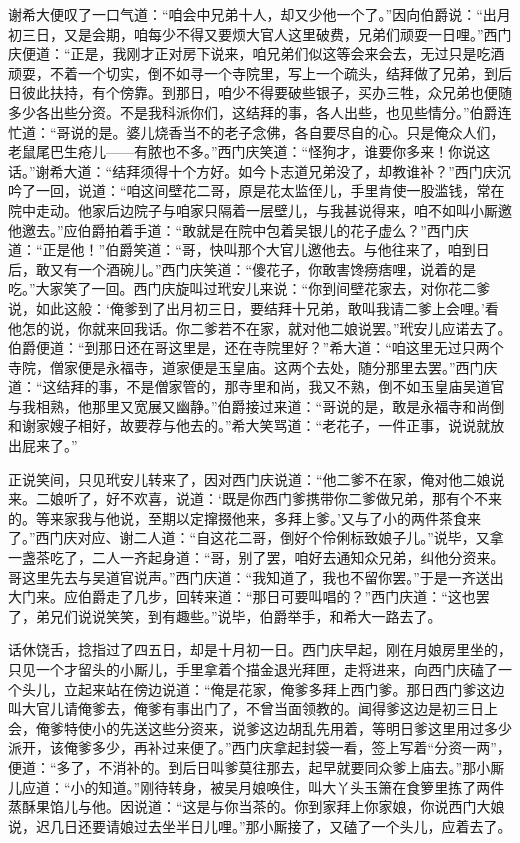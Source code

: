 谢希大便叹了一口气道：“咱会中兄弟十人，却又少他一个了。”因向伯爵说：“出月初三日，又是会期，咱每少不得又要烦大官人这里破费，兄弟们顽耍一日哩。”西门庆便道：“正是，我刚才正对房下说来，咱兄弟们似这等会来会去，无过只是吃酒顽耍，不着一个切实，倒不如寻一个寺院里，写上一个疏头，结拜做了兄弟，到后日彼此扶持，有个傍靠。到那日，咱少不得要破些银子，买办三牲，众兄弟也便随多少各出些分资。不是我科派你们，这结拜的事，各人出些，也见些情分。”伯爵连忙道：“哥说的是。婆儿烧香当不的老子念佛，各自要尽自的心。只是俺众人们，老鼠尾巴生疮儿——有脓也不多。”西门庆笑道：“怪狗才，谁要你多来！你说这话。”谢希大道：“结拜须得十个方好。如今卜志道兄弟没了，却教谁补？”西门庆沉吟了一回，说道：“咱这间壁花二哥，原是花太监侄儿，手里肯使一股滥钱，常在院中走动。他家后边院子与咱家只隔着一层壁儿，与我甚说得来，咱不如叫小厮邀他邀去。”应伯爵拍着手道：“敢就是在院中包着吴银儿的花子虚么？”西门庆道：“正是他！”伯爵笑道：“哥，快叫那个大官儿邀他去。与他往来了，咱到日后，敢又有一个酒碗儿。”西门庆笑道：“傻花子，你敢害馋痨痞哩，说着的是吃。”大家笑了一回。西门庆旋叫过玳安儿来说：“你到间壁花家去，对你花二爹说，如此这般：‘俺爹到了出月初三日，要结拜十兄弟，敢叫我请二爹上会哩。’看他怎的说，你就来回我话。你二爹若不在家，就对他二娘说罢。”玳安儿应诺去了。伯爵便道：“到那日还在哥这里是，还在寺院里好？”希大道：“咱这里无过只两个寺院，僧家便是永福寺，道家便是玉皇庙。这两个去处，随分那里去罢。”西门庆道：“这结拜的事，不是僧家管的，那寺里和尚，我又不熟，倒不如玉皇庙吴道官与我相熟，他那里又宽展又幽静。”伯爵接过来道：“哥说的是，敢是永福寺和尚倒和谢家嫂子相好，故要荐与他去的。”希大笑骂道：“老花子，一件正事，说说就放出屁来了。”

正说笑间，只见玳安儿转来了，因对西门庆说道：“他二爹不在家，俺对他二娘说来。二娘听了，好不欢喜，说道：‘既是你西门爹携带你二爹做兄弟，那有个不来的。等来家我与他说，至期以定撺掇他来，多拜上爹。’又与了小的两件茶食来了。”西门庆对应、谢二人道：“自这花二哥，倒好个伶俐标致娘子儿。”说毕，又拿一盏茶吃了，二人一齐起身道：“哥，别了罢，咱好去通知众兄弟，纠他分资来。哥这里先去与吴道官说声。”西门庆道：“我知道了，我也不留你罢。”于是一齐送出大门来。应伯爵走了几步，回转来道：“那日可要叫唱的？”西门庆道：“这也罢了，弟兄们说说笑笑，到有趣些。”说毕，伯爵举手，和希大一路去了。

话休饶舌，捻指过了四五日，却是十月初一日。西门庆早起，刚在月娘房里坐的，只见一个才留头的小厮儿，手里拿着个描金退光拜匣，走将进来，向西门庆磕了一个头儿，立起来站在傍边说道：“俺是花家，俺爹多拜上西门爹。那日西门爹这边叫大官儿请俺爹去，俺爹有事出门了，不曾当面领教的。闻得爹这边是初三日上会，俺爹特使小的先送这些分资来，说爹这边胡乱先用着，等明日爹这里用过多少派开，该俺爹多少，再补过来便了。”西门庆拿起封袋一看，签上写着“分资一两”，便道：“多了，不消补的。到后日叫爹莫往那去，起早就要同众爹上庙去。”那小厮儿应道：“小的知道。”刚待转身，被吴月娘唤住，叫大丫头玉箫在食箩里拣了两件蒸酥果馅儿与他。因说道：“这是与你当茶的。你到家拜上你家娘，你说西门大娘说，迟几日还要请娘过去坐半日儿哩。”那小厮接了，又磕了一个头儿，应着去了。


